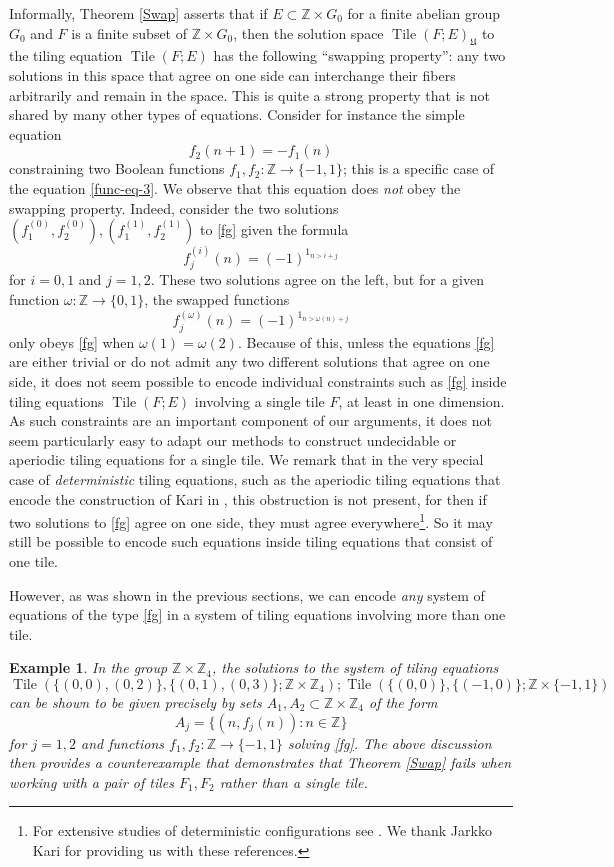 \documentclass[reqno,a4paper,12pt]{amsart}
\numberwithin{equation}{section}
\numberwithin{figure}{section}
\def\Z{\mathbb{Z}}
\newcommand{\Tile}{\operatorname{Tile}}
\newcommand{\Universe}{{\mathfrak{U}}}
\theoremstyle{plain}
\newtheorem{example}[thm]{Example}
\theoremstyle{definition}
\begin{document}
Informally, Theorem \ref{Swap} asserts that if $E \subset \Z \times G_0$ for a finite abelian group $G_0$ and $F$ is a finite subset of $\Z \times G_0$, then the solution space $\Tile(F;E)_\Universe$ to the tiling equation $\Tile(F;E)$ has the following ``swapping property'': any two solutions in this space that agree on one side can interchange their fibers arbitrarily and remain in the space.  This is quite a strong property that is not shared by many other types of equations.  Consider for instance the simple equation
\begin{equation}\label{fg}
f_2(n+1) = -f_1(n)
\end{equation}
constraining two Boolean functions $f_1,f_2 \colon \Z \to \{-1,1\}$; this is a specific case of the equation \eqref{func-eq-3}. We observe that this equation does \emph{not} obey the swapping property.  Indeed, consider the two solutions $(f^{(0)}_1, f^{(0)}_2), (f^{(1)}_1, f^{(1)}_2)$ to \eqref{fg} given the formula 
$$ f^{(i)}_j(n) = (-1)^{1_{n > i+j}}$$
for $i=0,1$ and $j=1,2$.  These two solutions agree on the left, but for a given function $\omega \colon \Z \to \{0,1\}$, the swapped functions
$$ f^{(\omega)}_j(n) = (-1)^{1_{n > \omega(n)+j}}$$
only obeys \eqref{fg} when $\omega(1)=\omega(2)$.    Because of this, unless the equations \eqref{fg} are either trivial or do not admit any two different solutions that agree on one side, it does not seem possible to encode individual constraints such as \eqref{fg} inside tiling equations $\Tile(F;E)$ involving a single tile $F$,  at least in one dimension.
As such constraints are an important component of our arguments, it does not seem particularly easy to adapt our methods to construct undecidable or aperiodic tiling equations for a single tile. We remark that in the very special case of \textit{deterministic} tiling equations,  such as the aperiodic tiling equations that encode the construction of Kari in \cite{kari},  this obstruction is not present, for then if two solutions to \eqref{fg}   agree on one side, they must agree everywhere\footnote{For extensive studies of deterministic configurations see \cite{k92,kp,Lukk}. We thank Jarkko Kari for providing us with these references.}.  So it may still be possible to encode such equations inside tiling equations that consist of  one tile.

However, as was shown in the previous sections, we can encode \emph{any} system of equations of the type \eqref{fg} in a system of  tiling equations  involving more than one tile. 

\begin{example}  In the group $\Z \times \Z_4$, the solutions to the system of tiling equations
$$ \Tile( \{(0,0), (0,2)\}, \{(0,1), (0,3)\}; \Z \times \Z_4 );
 \Tile( \{(0,0)\}, \{(-1,0)\}; \Z \times \{-1,1\} ) $$
 can be shown to be given precisely by sets $A_1,A_2 \subset \Z \times \Z_4$ of the form
 $$ A_j = \{ (n, f_j(n)): n \in \Z\}$$
 for $j=1,2$ and functions $f_1,f_2 \colon \Z \to \{-1,1\}$ solving \eqref{fg}.  The above discussion then provides a counterexample that demonstrates that Theorem \ref{Swap} fails when working with a pair of tiles $F_1,F_2$ rather than a single tile.
 \end{example} 
 
\end{document}
